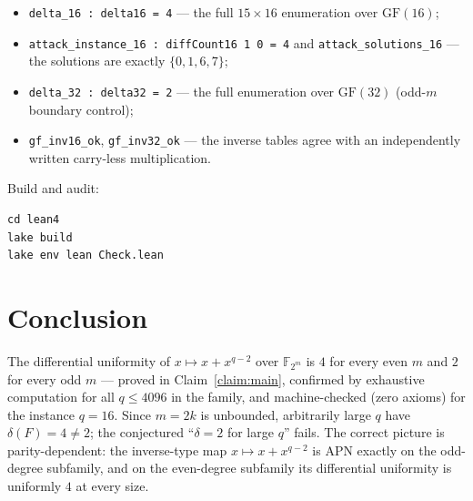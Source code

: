 \documentclass[11pt]{article}
\newcommand{\F}{\mathbb{F}}
\newcommand{\GF}{\mathrm{GF}}
\newcommand{\duni}{\delta}
\begin{document}
\begin{itemize}
  \item \texttt{delta\_16 : delta16 = 4} --- the full $15 \times 16$
        enumeration over $\GF(16)$;
  \item \texttt{attack\_instance\_16 : diffCount16 1 0 = 4} and
        \texttt{attack\_solutions\_16} --- the solutions are exactly
        $\{0,1,6,7\}$;
  \item \texttt{delta\_32 : delta32 = 2} --- the full enumeration over
        $\GF(32)$ (odd-$m$ boundary control);
  \item \texttt{gf\_inv16\_ok}, \texttt{gf\_inv32\_ok} --- the inverse tables
        agree with an independently written carry-less multiplication.
\end{itemize}

Build and audit:
\begin{verbatim}
cd lean4
lake build
lake env lean Check.lean
\end{verbatim}

\section{Conclusion}

The differential uniformity of $x \mapsto x + x^{q-2}$ over $\F_{2^m}$ is
$4$ for every even $m$ and $2$ for every odd $m$ --- proved in
Claim~\ref{claim:main}, confirmed by exhaustive computation for all
$q \leq 4096$ in the family, and machine-checked (zero axioms) for the
instance $q = 16$.  Since $m = 2k$ is unbounded, arbitrarily large $q$ have
$\duni(F) = 4 \neq 2$; the conjectured ``$\duni = 2$ for large $q$'' fails.
The correct picture is parity-dependent: the inverse-type map
$x \mapsto x + x^{q-2}$ is APN exactly on the odd-degree subfamily, and on
the even-degree subfamily its differential uniformity is uniformly $4$ at
every size.
\end{document}
